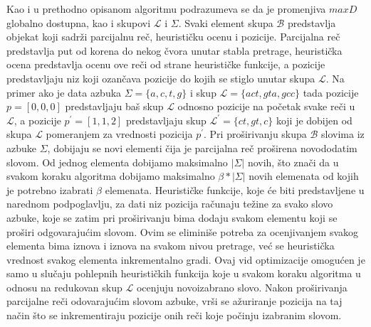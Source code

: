 \documentclass[12pt,oneside]{memoir}
\begin{document}
Kao i u prethodno opisanom algoritmu podrazumeva se da je promenjiva $maxD$ globalno dostupna,
kao i skupovi $\mathcal{L}$ i $\Sigma$. Svaki element skupa $\mathcal{B}$ predstavlja objekat koji
sadrži parcijalnu reč, heurističku ocenu i pozicije.
Parcijalna reč predstavlja put od korena do nekog čvora unutar stabla pretrage, 
heuristička ocena predstavlja ocenu ove reči od strane heurističke funkcije, a pozicije predstavljaju
niz koji ozančava pozicije do kojih se stiglo unutar skupa $\mathcal{L}$.
Na primer ako je data azbuka $\Sigma=\{a, c, t, g\}$ i skup $\mathcal{L}=\{act,gta,gcc\}$ tada
pozicije $p=[0,0,0]$ predstavljaju baš skup $\mathcal{L}$ odnosno
pozicije na početak svake reči u $\mathcal{L}$, a pozicije $p^{'}=[1,1,2]$ predstavljaju
skup $\mathcal{L}^{'}=\{ct,gt,c\}$ koji je dobijen od skupa $\mathcal{L}$ pomeranjem
za vrednosti pozicija $p^{'}$.  
Pri proširivanju skupa $\mathcal{B}$ slovima iz azbuke $\Sigma$, dobijaju se novi
elementi čija je parcijalna reč proširena novododatim slovom. Od jednog elementa
dobijamo maksimalno $|\Sigma|$ novih, što znači da u svakom koraku algoritma dobijamo
maksimalno $\beta * |\Sigma|$ novih elemenata od kojih je potrebno izabrati $\beta$ 
elemenata. 
Heurističke funkcije, koje će biti predstavljene u narednom podpoglavlju,
za dati niz pozicija računaju težine za svako slovo azbuke, koje se zatim pri proširivanju bima
dodaju svakom elementu koji se proširi odgovarajućim slovom. Ovim se eliminiše potreba za ocenjivanjem
svakog elementa bima iznova i iznova na svakom nivou pretrage, već se heuristička vrednost svakog elementa
inkrementalno gradi. Ovaj vid optimizacije omogućen je samo u slučaju pohlepnih heurističkih funkcija
koje u svakom koraku algoritma u odnosu na redukovan skup $\mathcal{L}$ ocenjuju
novoizabrano slovo.
Nakon proširivanja parcijalne reči odovarajućim slovom azbuke,
vrši se ažuriranje pozicija na taj način što se inkrementiraju pozicije 
onih reči koje počinju izabranim slovom.
\end{document}
